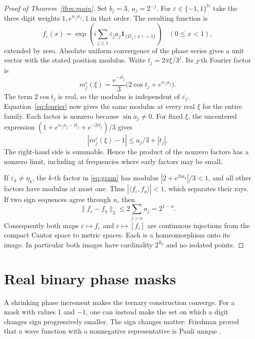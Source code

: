 \documentclass[11pt,reqno]{amsart}
\newcommand{\N}{\mathbb N}
\newcommand{\one}{\mathbf 1}
\begin{document}
\begin{proof}[Proof of Theorem~\ref{thm:main}]
Set \(b_j=3,\ a_j=2^{-j}\). For \(\varepsilon\in\{-1,1\}^{\N}\) take the three digit weights \(1,e^{i\varepsilon_j a_j},1\) in that order. The resulting function is
\[
 f_\varepsilon(x)=\exp\!\left(i\sum_{j\ge1}
 \varepsilon_j a_j\one_{\{D_j(x)=1\}}\right)
 \quad(0\le x<1),
\]
extended by zero. Absolute uniform convergence of the phase series gives a unit vector with the stated position modulus. Write \(t_j=2\pi\xi/3^j\). Its \(j\)-th Fourier factor is
\[
 m_j^\varepsilon(\xi)
   =\frac{e^{-it_j}}{3}\big(2\cos t_j+e^{i\varepsilon_j a_j}\big).
\]
The term \(2\cos t_j\) is real, so the modulus is independent of \(\varepsilon_j\). Equation~\eqref{eq:fourier} now gives the same modulus at every real \(\xi\) for the entire family. Each factor is nonzero because \(\sin a_j\ne0\). For fixed \(\xi\), the uncentered expression \((1+e^{i\varepsilon_j a_j-it_j}+e^{-2it_j})/3\) gives
\[
 |m_j^\varepsilon(\xi)-1|\le a_j/3+|t_j|.
\]
The right-hand side is summable. Hence the product of the nonzero factors has a nonzero limit, including at frequencies where early factors may be small.

If \(\varepsilon_k\ne\eta_k\), the \(k\)-th factor in \eqref{eq:gram} has modulus \(|2+e^{2ia_k}|/3<1\), and all other factors have modulus at most one. Thus \(|\langle f_\varepsilon,f_\eta\rangle|<1\), which separates their rays. If two sign sequences agree through \(n\), then
\[
 \|f_\varepsilon-f_\eta\|_2\le 2\sum_{j>n}a_j=2^{1-n}.
\]
Consequently both maps \(\varepsilon\mapsto f_\varepsilon\) and \(\varepsilon\mapsto[f_\varepsilon]\) are continuous injections from the compact Cantor space to metric spaces. Each is a homeomorphism onto its image. In particular both images have cardinality \(2^{\aleph_0}\) and no isolated points.
\end{proof}

\section{Real binary phase masks}

A shrinking phase increment makes the ternary construction converge. For a mask with values \(1\) and \(-1\), one can instead make the set on which a digit changes sign progressively smaller. The sign changes matter: Friedman proved that a wave function with a nonnegative representative is Pauli unique \cite[Theorem~1]{friedman}.
\end{document}
